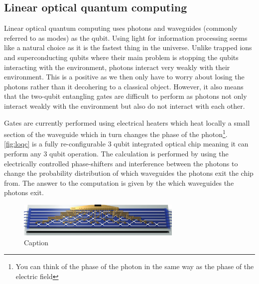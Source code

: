 \subsection{Linear optical quantum computing}

Linear optical quantum computing uses photons and waveguides (commonly referred to as modes) as the qubit. Using light for information processing seems like a natural choice as it is the fastest thing in the universe. Unlike trapped ions and superconducting qubits where their main problem is stopping the qubits interacting with the environment, photons interact very weakly with their environment. This is a positive as we then only have to worry about losing the photons rather than it decohering to a classical object. However, it also means that the two-qubit entangling gates are difficult to perform as photons not only interact weakly with the environment but also do not interact with each other.

Gates are currently performed using electrical heaters which heat locally a small section of the waveguide which in turn changes the phase of the photon\footnote{You can think of the phase of the photon in the same way as the phase of the electric field}. \autoref{fig:loqc} is a fully re-configurable 3 qubit integrated optical chip meaning it can perform any 3 qubit operation. The calculation is performed by using the electrically controlled phase-shifters and interference between the photons to change the probability distribution of which waveguides the photons exit the chip from. The answer to the computation is given by the which waveguides the photons exit.

\begin{figure}[H]
    \centering
    \includegraphics[width=0.7\textwidth]{figures/impl/rekkchip.png}
    \caption{Caption \cite{carolan2015universal}}
    \label{fig:loqc}
\end{figure}

